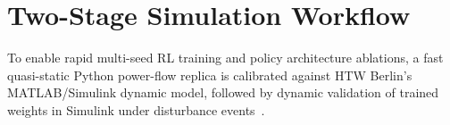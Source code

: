 \section{Two-Stage Simulation Workflow}
To enable rapid multi-seed RL training and policy architecture ablations, a fast quasi-static Python power-flow replica is calibrated against HTW Berlin's MATLAB/Simulink dynamic model, followed by dynamic validation of trained weights in Simulink under disturbance events~\cite{Mughni2026}.
